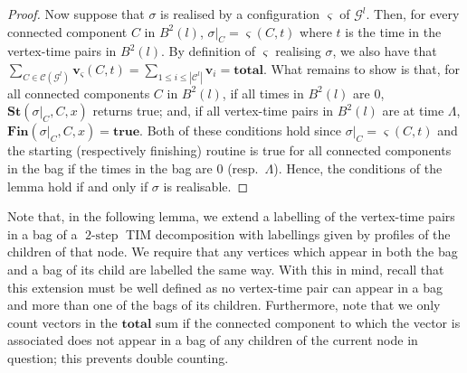 \documentclass[a4paper,UKenglish,cleveref, autoref, thm-restate]{lipics-v2021} %
\DeclareMathOperator{\twostep}{2-step}
\begin{document}
\begin{toappendix}
\begin{proof}
    Now suppose that $\sigma$ is realised by a configuration $\varsigma$ of $\mathcal{G}^l$. Then, for every connected component $C$ in $B^2(l)$, $\sigma|_C=\varsigma(C,t)$ where $t$ is the time in the vertex-time pairs in $B^2(l)$. By definition of $\varsigma$ realising $\sigma$, we also have that $\sum_{C\in \mathcal{C}(\mathcal{G}^l)}\textbf{v}_{\varsigma}(C,t)= \sum_{1\leq i\leq |\mathcal{C}^l|}\textbf{v}_i=\textbf{total}$. What remains to show is that, for all connected components $C$ in $B^2(l)$, if all times in $B^2(l)$ are 0, $\textbf{St}(\sigma|_{C}, C,x)$ returns true; and, if all vertex-time pairs in $B^2(l)$ are at time $\Lambda$, $\textbf{Fin}(\sigma|_{C}, C,x)=\textbf{true}$. Both of these conditions hold since $\sigma|_C=\varsigma(C,t)$ and the starting (respectively finishing) routine is true for all connected components in the bag if the times in the bag are 0 (resp.~$\Lambda$). Hence, the conditions of the lemma hold if and only if $\sigma$ is realisable.
\end{proof}

Note that, in the following lemma, we extend a labelling of the vertex-time pairs in a bag of a $\twostep$ TIM decomposition with labellings given by profiles of the children of that node. We require that any vertices which appear in both the bag and a bag of its child are labelled the same way. With this in mind, recall that this extension must be well defined as no vertex-time pair can appear in a bag and more than one of the bags of its children. Furthermore, note that we only count vectors in the $\textbf{total}$ sum if the connected component to which the vector is associated does not appear in a bag of any children of the current node in question; this prevents double counting.


\end{toappendix}
\end{document}
